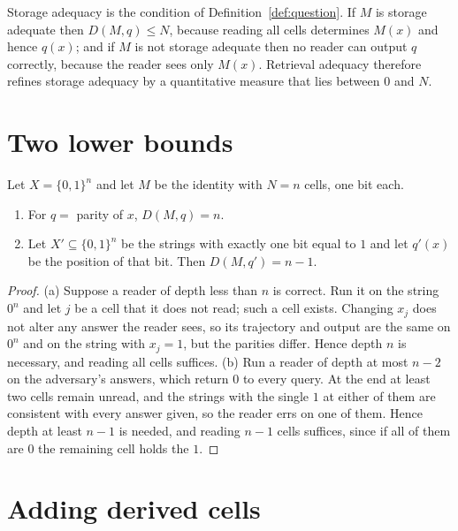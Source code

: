 Storage adequacy is the condition of Definition~\ref{def:question}. If $M$ is storage adequate then $D(M,q)\le N$, because reading all cells determines $M(x)$ and hence $q(x)$; and if $M$ is not storage adequate then no reader can output $q$ correctly, because the reader sees only $M(x)$. Retrieval adequacy therefore refines storage adequacy by a quantitative measure that lies between $0$ and $N$.

\section{Two lower bounds}

\begin{newresult}\label{prop:probes}
Let $X=\{0,1\}^{n}$ and let $M$ be the identity with $N=n$ cells, one bit each.
\begin{enumerate}[nosep,label=(\alph*)]
  \item For $q=$ parity of $x$, $D(M,q)=n$.
  \item Let $X'\subseteq\{0,1\}^{n}$ be the strings with exactly one bit equal to $1$ and let $q'(x)$ be the position of that bit. Then $D(M,q')=n-1$.
\end{enumerate}
\end{newresult}
\begin{proof}
(a) Suppose a reader of depth less than $n$ is correct. Run it on the string $0^{n}$ and let $j$ be a cell that it does not read; such a cell exists. Changing $x_j$ does not alter any answer the reader sees, so its trajectory and output are the same on $0^{n}$ and on the string with $x_j=1$, but the parities differ. Hence depth $n$ is necessary, and reading all cells suffices. (b) Run a reader of depth at most $n-2$ on the adversary's answers, which return $0$ to every query. At the end at least two cells remain unread, and the strings with the single $1$ at either of them are consistent with every answer given, so the reader errs on one of them. Hence depth at least $n-1$ is needed, and reading $n-1$ cells suffices, since if all of them are $0$ the remaining cell holds the $1$.
\end{proof}

\section{Adding derived cells}

